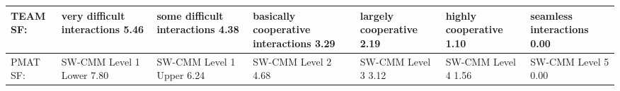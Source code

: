 \documentclass[12pt, oneside]{book}   	%
\begin{document}
\begin{table}[h]
\begin{tabular}{|p{1.5cm}|p{2cm}|p{2cm}|p{2cm}|p{1.5cm}|p{2cm}|p{2cm}|}
\hline
TEAM \newline \newline \newline SF: &  \scriptsize{very difficult interactions} \newline \newline \normalsize{5.46} &  \scriptsize{some difficult interactions} \newline \newline \normalsize{4.38} &  \scriptsize{basically cooperative interactions} \newline \normalsize{3.29} &  \scriptsize{largely cooperative} \newline \newline \normalsize{2.19} &  \scriptsize{highly cooperative} \newline \newline\normalsize{1.10} &  \scriptsize{seamless interactions} \newline \newline \normalsize{0.00} \\
\hline
PMAT \newline \newline SF: &  \scriptsize{SW-CMM Level 1 Lower} \normalsize{7.80} &  \scriptsize{SW-CMM Level 1 Upper} \normalsize{6.24} &  \scriptsize{SW-CMM Level 2} \newline \normalsize{4.68} &  \scriptsize{SW-CMM Level 3} \normalsize{3.12} &  \scriptsize{SW-CMM Level 4} \newline \normalsize{1.56} &  \scriptsize{SW-CMM Level 5} \newline \normalsize{0.00} \\
\hline
\end{tabular}
\end{table}
\end{document}
